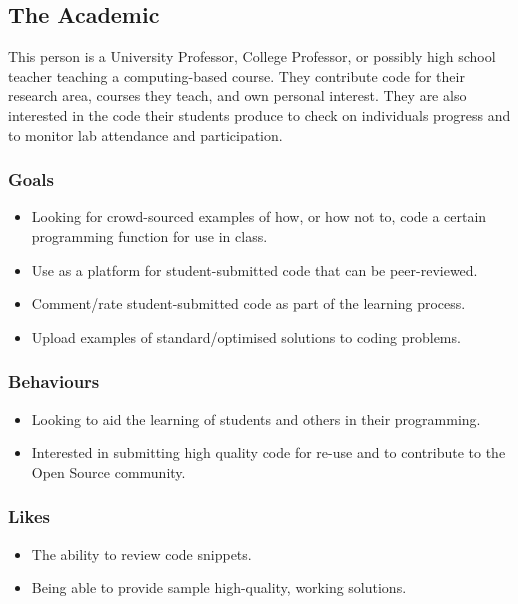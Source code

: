 \documentclass[11pt,a4paper]{article}
\begin{document}
\newpage

\subsection{The Academic}

This person is a University Professor, College Professor, or possibly high
school teacher teaching a computing-based course. They contribute code for
their research area, courses they teach, and own personal interest. They are
also interested in the code their students produce to check on individuals
progress and to monitor lab attendance and participation.

\subsubsection{Goals}

\begin{itemize}
\item Looking for crowd-sourced examples of how, or how not to, code a certain
programming function for use in class.
\item Use as a platform for student-submitted code that can be peer-reviewed.
\item Comment/rate student-submitted code as part of the learning process.
\item Upload examples of standard/optimised solutions to coding problems.
\end{itemize}

\subsubsection{Behaviours}

\begin{itemize}
\item Looking to aid the learning of students and others in their programming.
\item Interested in submitting high quality code for re-use and to contribute
to the Open Source community.
\end{itemize}

\subsubsection{Likes}

\begin{itemize}
\item The ability to review code snippets.
\item Being able to provide sample high-quality, working solutions.
\end{itemize}
\end{document}
